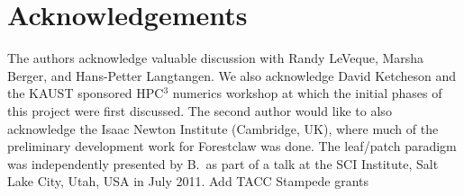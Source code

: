 \documentclass{IOS-Book-Article}     %
\newcommand{\forestclaw}{Forestclaw\xspace}
\newcommand{\alert}[1]{{\color{red}#1}}
\begin{document}
\section*{Acknowledgements}

The authors acknowledge valuable discussion with Randy LeVeque, Marsha
Berger, and Hans-Petter Langtangen.  We also acknowledge David
Ketcheson and the KAUST sponsored HPC$^3$ numerics workshop at which
the initial phases of this project were first discussed.  The second
author would like to also acknowledge the Isaac Newton Institute
(Cambridge, UK), where much of the preliminary development work for
\forestclaw was done. The leaf/patch paradigm was independently
presented by B.\ as part of a talk at the SCI Institute, Salt Lake City, Utah,
USA in July 2011.
\alert{Add TACC Stampede grants}




\end{document}
